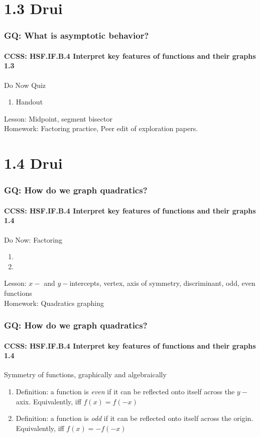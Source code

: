 \documentclass{beamer}
\begin{document}
  \section{1.3 Drui}
  \frame
  {
    \frametitle{GQ: What is asymptotic behavior?}
    \framesubtitle{CCSS: HSF.IF.B.4 Interpret key features of functions and their graphs \qquad \alert{1.3}}

    \begin{block}{Do Now Quiz}
    \begin{enumerate}
        \item Handout
    \end{enumerate}
    \end{block}
    Lesson: Midpoint, segment bisector
    \\%
    Homework: Factoring practice, Peer edit of exploration papers.
  }

  \section{1.4 Drui}
  \frame
  {
    \frametitle{GQ: How do we graph quadratics?}
    \framesubtitle{CCSS: HSF.IF.B.4 Interpret key features of functions and their graphs \qquad \alert{1.4}}

    \begin{block}{Do Now: Factoring}
    \begin{enumerate}
        \item
        \item
    \end{enumerate}
    \end{block}
    Lesson: $x-$ and $y-$intercepts, vertex, axis of symmetry, discriminant, odd, even functions
    \\%
    Homework: Quadratics graphing
  }

  \frame
  {
    \frametitle{GQ: How do we graph quadratics?}
    \framesubtitle{CCSS: HSF.IF.B.4 Interpret key features of functions and their graphs \qquad \alert{1.4}}

    \begin{block}{Symmetry of functions, graphically and algebraically}
    \begin{enumerate}
        \item Definition: a function is \emph{even} if it can be reflected onto itself across the $y-$axix. Equivalently, iff $f(x)=f(-x)$
        \item Definition: a function is \emph{odd} if it can be reflected onto itself across the origin. Equivalently, iff $f(x)=-f(-x)$
    \end{enumerate}
    \end{block}
  }
\end{document}
